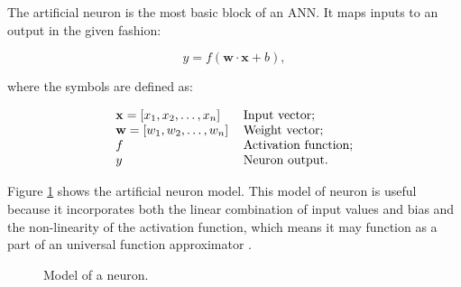 The artificial neuron is the most basic block of an ANN. It maps inputs to an output in the given fashion:

\begin{equation} \label{eq:neuron_eq}
	y = f(\mathbf{w} \cdot \mathbf{x} + b),
\end{equation}

where the symbols are defined as:

\begin{equation} \label{eq:neuron_symbols}
	\begin{tabular}{ll}
		$\mathbf{x} = [x_1, x_2, \ldots, x_n]$ & Input vector;\\
		$\mathbf{w} = [w_1, w_2, \ldots, w_n]$ & Weight vector;\\
		$f$ & Activation function; \\
		$y$ & Neuron output.
	\end{tabular}
\end{equation}

Figure \ref{fig:neuron} shows the artificial neuron model. This model of neuron is useful because it incorporates both the linear combination of input values and bias and the non-linearity of the activation function, which means it may function as a part of an universal function approximator \cite{HORNIK1989}.

\begin{figure}[ht]
	\centering
	\caption{Model of a neuron.} \label{fig:neuron}
\end{figure}

